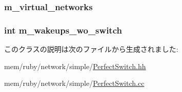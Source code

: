 \label{classPerfectSwitch_aace5aee128494c07cfc442438ef9d0cd}
\hypertarget{classPerfectSwitch_a3c1d97c5d987e52985843dcb76edc7fb}{
\subsubsection[{m\_\-virtual\_\-networks}]{ {\bf m\_\-virtual\_\-networks}}}
\label{classPerfectSwitch_a3c1d97c5d987e52985843dcb76edc7fb}
\hypertarget{classPerfectSwitch_aae3ca2ac27d25e29fa0b1856a862d658}{
\subsubsection[{m\_\-wakeups\_\-wo\_\-switch}]{\setlength{\rightskip}{0pt plus 5cm}int {\bf m\_\-wakeups\_\-wo\_\-switch}}}
\label{classPerfectSwitch_aae3ca2ac27d25e29fa0b1856a862d658}


このクラスの説明は次のファイルから生成されました:\begin{DoxyCompactItemize}
\item 
mem/ruby/network/simple/\hyperlink{PerfectSwitch_8hh}{PerfectSwitch.hh}\item 
mem/ruby/network/simple/\hyperlink{PerfectSwitch_8cc}{PerfectSwitch.cc}\end{DoxyCompactItemize}
